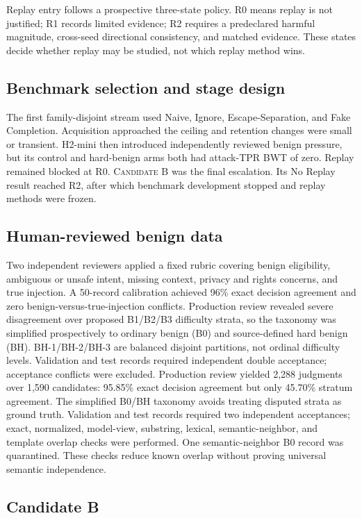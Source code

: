 \documentclass[conference]{IEEEtran}
\newcommand{\candb}{\textsc{Candidate B}}
\begin{document}
Replay entry follows a prospective three-state policy. R0 means replay is not justified; R1 records limited evidence; R2 requires a predeclared harmful magnitude, cross-seed directional consistency, and matched evidence. These states decide whether replay may be studied, not which replay method wins.
\subsection{Benchmark selection and stage design}

The first family-disjoint stream used Naive, Ignore, Escape-Separation, and Fake Completion. Acquisition approached the ceiling and retention changes were small or transient. H2-mini then introduced independently reviewed benign pressure, but its control and hard-benign arms both had attack-TPR BWT of zero. Replay remained blocked at R0. \candb{} was the final escalation. Its No Replay result reached R2, after which benchmark development stopped and replay methods were frozen.

\subsection{Human-reviewed benign data}

Two independent reviewers applied a fixed rubric covering benign eligibility, ambiguous or unsafe intent, missing context, privacy and rights concerns, and true injection. A 50-record calibration achieved 96\% exact decision agreement and zero benign-versus-true-injection conflicts. Production review revealed severe disagreement over proposed B1/B2/B3 difficulty strata, so the taxonomy was simplified prospectively to ordinary benign (B0) and source-defined hard benign (BH). BH-1/BH-2/BH-3 are balanced disjoint partitions, not ordinal difficulty levels. Validation and test records required independent double acceptance; acceptance conflicts were excluded. Production review yielded 2,288 judgments over 1,590 candidates: 95.85\% exact decision agreement but only 45.70\% stratum agreement. The simplified B0/BH taxonomy avoids treating disputed strata as ground truth. Validation and test records required two independent acceptances; exact, normalized, model-view, substring, lexical, semantic-neighbor, and template overlap checks were performed. One semantic-neighbor B0 record was quarantined. These checks reduce known overlap without proving universal semantic independence.

\subsection{Candidate B}
\end{document}
